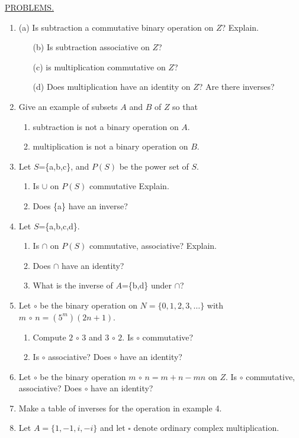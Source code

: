 \documentclass[12pt]{book}
\theoremstyle{definition}
\begin{document}
\underline{PROBLEMS.}
\begin{enumerate}
\item (a) Is subtraction a commutative binary operation on $Z$?  Explain.
\begin{enumerate}
\item[(b)] Is subtraction associative on $Z$?
\item[(c)]  is multiplication commutative on $Z$?
\item[(d)]  Does multiplication have an identity on $Z$?  Are there inverses?
\end{enumerate}
\item Give an example of subsets $A$ and $B$ of $Z$ so that
\begin{enumerate}
\item subtraction is not a binary operation on $A$.
\item multiplication is not a binary operation on $B$.
\end{enumerate}
\item Let $S$=\{a,b,c\}, and $P(S)$ be the power set of $S$.
\begin{enumerate}
\item Is $\cup$ on $P(S)$ commutative  Explain.
\item Does \{a\} have an inverse?
\end{enumerate}
\item Let $S$=\{a,b,c,d\}.
\begin{enumerate}
\item Is $\cap$ on $P(S)$ commutative, associative?  Explain.
\item Does $\cap$ have an identity?
\item What is the inverse of $A$=\{b,d\} under $\cap$?
\end{enumerate}
\item Let $\circ$ be the binary operation on $N=\{0,1,2,3,\dots\}$ with $m\,\circ\,n = (5^m)(2n+1)$.
\begin{enumerate}
\item Compute $2\,\circ\, 3$ and $ 3\,\circ\,2$.  Is $\circ$ commutative?
\item Is $\circ$ associative?  Does $\circ$ have an identity?
\end{enumerate}
\item Let $\circ$ be the binary operation $m\,\circ\,n=m+n-mn$ on $Z$.  Is $\circ$ commutative, associative?  Does $\circ$ have an identity?
\item Make a table of inverses for the operation in example 4.
\item Let $A=\{1,-1,i,-i\}$ and let $\square$ denote ordinary complex multiplication.\\

\end{enumerate}
\end{document}
